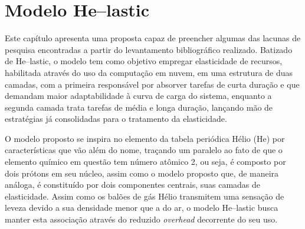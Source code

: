 \documentclass[english,brazilian]{UNISINOSmonografia} %
\begin{document}

\chapter{Modelo {H\lowercase{e}}--lastic }
\label{ch:modelo}




%





Este capítulo apresenta uma proposta capaz de preencher algumas das lacunas de pesquisa encontradas a partir do levantamento bibliográfico realizado.
Batizado de \textsf{He}--lastic, o modelo tem como objetivo empregar elasticidade de recursos, habilitada através do uso da computação em nuvem, em uma estrutura de duas camadas, com a primeira responsável por absorver tarefas de curta duração e que demandam maior adaptabilidade à curva de carga do sistema, enquanto a segunda camada trata tarefas de média e longa duração, lançando mão de estratégias já consolidadas para o tratamento da elasticidade.



O modelo proposto se inspira no elemento da tabela periódica Hélio (\textsf{He}) por características que vão além do nome, traçando um paralelo ao fato de que o elemento químico em questão tem número atômico 2, ou seja, é composto por dois prótons em seu núcleo, assim como o modelo proposto que, de maneira análoga, é constituído por dois componentes centrais, suas camadas de elasticidade.
Assim como os balões de gás Hélio transmitem uma sensação de leveza devido a sua densidade menor que a do ar, o modelo \textsf{He}--lastic busca manter esta associação através do reduzido \textit{overhead} decorrente do seu uso.
\end{document}

